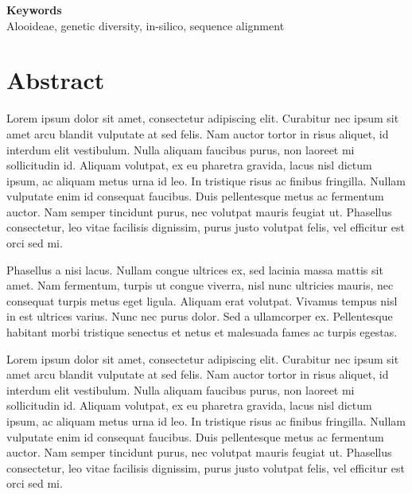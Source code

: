\documentclass[
  letterpaper,
  DIV=11,
  numbers=noendperiod]{scrreprt}
\begin{document}
\noindent\textbf{Keywords}\\
Alooideae, genetic diversity, in-silico, sequence alignment

\ifdefined\Shaded\renewenvironment{Shaded}{\begin{tcolorbox}[frame hidden, interior hidden, borderline west={3pt}{0pt}{shadecolor}, boxrule=0pt, breakable, sharp corners, enhanced]}{\end{tcolorbox}}\fi


\hypertarget{abstract}{%
\chapter*{Abstract}\label{abstract}}


Lorem ipsum dolor sit amet, consectetur adipiscing elit. Curabitur nec
ipsum sit amet arcu blandit vulputate at sed felis. Nam auctor tortor in
risus aliquet, id interdum elit vestibulum. Nulla aliquam faucibus
purus, non laoreet mi sollicitudin id. Aliquam volutpat, ex eu pharetra
gravida, lacus nisl dictum ipsum, ac aliquam metus urna id leo. In
tristique risus ac finibus fringilla. Nullam vulputate enim id consequat
faucibus. Duis pellentesque metus ac fermentum auctor. Nam semper
tincidunt purus, nec volutpat mauris feugiat ut. Phasellus consectetur,
leo vitae facilisis dignissim, purus justo volutpat felis, vel efficitur
est orci sed mi.

Phasellus a nisi lacus. Nullam congue ultrices ex, sed lacinia massa
mattis sit amet. Nam fermentum, turpis ut congue viverra, nisl nunc
ultricies mauris, nec consequat turpis metus eget ligula. Aliquam erat
volutpat. Vivamus tempus nisl in est ultrices varius. Nunc nec purus
dolor. Sed a ullamcorper ex. Pellentesque habitant morbi tristique
senectus et netus et malesuada fames ac turpis egestas.

Lorem ipsum dolor sit amet, consectetur adipiscing elit. Curabitur nec
ipsum sit amet arcu blandit vulputate at sed felis. Nam auctor tortor in
risus aliquet, id interdum elit vestibulum. Nulla aliquam faucibus
purus, non laoreet mi sollicitudin id. Aliquam volutpat, ex eu pharetra
gravida, lacus nisl dictum ipsum, ac aliquam metus urna id leo. In
tristique risus ac finibus fringilla. Nullam vulputate enim id consequat
faucibus. Duis pellentesque metus ac fermentum auctor. Nam semper
tincidunt purus, nec volutpat mauris feugiat ut. Phasellus consectetur,
leo vitae facilisis dignissim, purus justo volutpat felis, vel efficitur
est orci sed mi.
\end{document}
